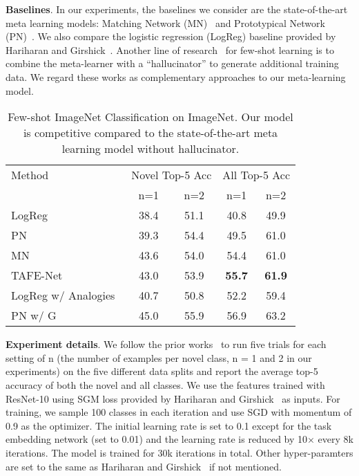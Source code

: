 \documentclass[10pt,twocolumn,letterpaper]{article}
\newcommand{\model}{TAFE-Net\xspace}
\newcommand\minisection[1]{\vspace{2mm}\noindent \textbf{#1}}
\begin{document}
\minisection{Baselines}. In our experiments, the  baselines we consider are the 
state-of-the-art meta learning models: Matching Network (MN)~\cite{vinyals2016matching}
and Prototypical Network (PN)~\cite{snell2017prototypical}. We also compare the logistic regression (LogReg) baseline provided by Hariharan and Girshick~\cite{hariharan2017low}. Another line of research~\cite{wang2018low, hariharan2017low} for few-shot learning is to combine
the meta-learner with a ``hallucinator'' to generate additional training data. We
regard these works as complementary approaches to our meta-learning model. 

\begin{table}[t]
	\centering
	\small
	\caption{Few-shot ImageNet Classification on ImageNet. Our model
		is competitive compared to the state-of-the-art meta learning model
		without hallucinator.}
	\label{tab:few-shot}
	\begin{tabular}{@{}l|cc|cc@{}}
Method & \multicolumn{2}{c}{Novel Top-5 Acc} & \multicolumn{2}{|c}{All Top-5 Acc} \\
		& n=1 & n=2  & n=1 & n=2  \\ 
		\midrule
		LogReg ~\cite{hariharan2017low} & 38.4 & 51.1  & 40.8 & 49.9 \\
		PN~\cite{snell2017prototypical} & 39.3 & 54.4  &  49.5 & 61.0 \\
		MN~\cite{vinyals2016matching} &  43.6 & 54.0  &  54.4 & 61.0  \\
		\midrule
		\model & 43.0 & 53.9 & \textbf{55.7} & \textbf{61.9} \\
		\midrule\midrule
		LogReg w/ Analogies~\cite{hariharan2017low} & 40.7 & 50.8 & 52.2 & 59.4 \\
		PN w/ G ~\cite{wang2018low} & 45.0 & 55.9 & 56.9 & 63.2 \\ 
\bottomrule
	\end{tabular}\vspace{-1em}
\end{table}

\minisection{Experiment details}. We follow the prior works~\cite{hariharan2017low, wang2018low} to run five trials for each setting of n (the number of examples per
novel class, n = 1 and 2 in our experiments) on the five different data splits and report the average top-5 accuracy of both
the novel and all classes. We use the features trained with ResNet-10 using SGM
loss provided by Hariharan and Girshick~\cite{hariharan2017low} as inputs. 
For training, we sample 100
classes in each iteration and use SGD with momentum of 0.9 as the optimizer. The
initial learning rate is set to 0.1 except for the task embedding network (set to
0.01) and the learning rate is reduced by 10$\times$ every 8k iterations.
The model is trained for 
30k iterations in total. Other hyper-paramters are set to the same as Hariharan and Girshick~\cite{hariharan2017low} if not mentioned.
\end{document}
